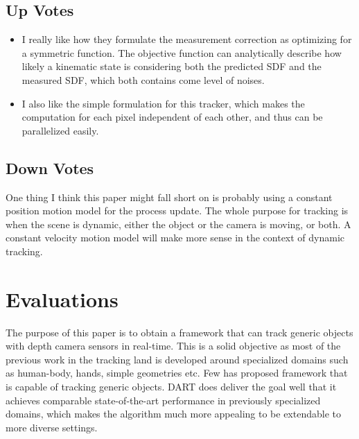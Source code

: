 \documentclass[10pt, twocolumn]{article}
\begin{document}
\subsection{Up Votes}
\begin{itemize}
  \item I really like how they formulate the measurement correction as optimizing
    for a symmetric function. The objective function can analytically describe
    how likely a kinematic state is considering both the predicted SDF and the
    measured SDF, which both contains come level of noises.

  \item I also like the simple formulation for this tracker, which makes the
    computation for each pixel independent of each other, and thus can be
    parallelized easily.
\end{itemize}

\subsection{Down Votes}
One thing I think this paper might fall short on is probably using a
constant position motion model for the process update. The whole purpose
for tracking is when the scene is dynamic, either the object or the camera
is moving, or both. A constant velocity motion model will make more sense
in the context of dynamic tracking.

\section{Evaluations}
The purpose of this paper is to obtain a framework that can track generic
objects with depth camera sensors in real-time. This is a solid objective
as most of the previous work in the tracking land is developed around
specialized domains such as human-body, hands, simple geometries etc. Few
has proposed framework that is capable of tracking generic objects. DART
does deliver the goal well that it achieves comparable state-of-the-art performance
in previously specialized domains, which makes the algorithm much more
appealing to be extendable to more diverse settings.
\end{document}
